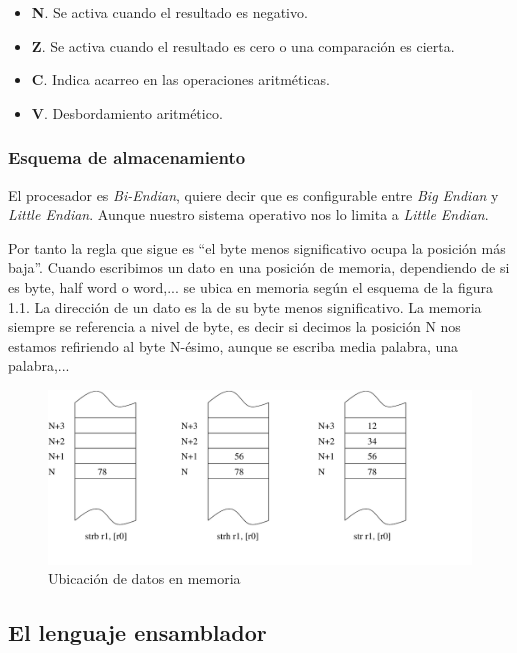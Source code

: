 \begin{descript}
    \begin{itemize}
      \item{\textbf{N}. Se activa cuando el resultado es negativo.}
      \item{\textbf{Z}. Se activa cuando el resultado es cero o una comparación es cierta.}
      \item{\textbf{C}. Indica acarreo en las operaciones aritméticas.}
      \item{\textbf{V}. Desbordamiento aritmético.}
    \end{itemize}
\end{descript}


\subsubsection{Esquema de almacenamiento}

El procesador es {\it Bi-Endian}, quiere decir que es configurable entre {\it Big Endian}
y {\it Little Endian}. Aunque nuestro sistema operativo nos lo limita a {\it Little Endian}.

Por tanto la regla que sigue es ``el byte menos significativo ocupa la posición más baja''.
Cuando escribimos un dato en una posición de memoria, dependiendo de si es byte, half word
o word,... se ubica en memoria según el esquema de la figura 1.1. La dirección de un dato
es la de su byte menos significativo. La memoria siempre se referencia a nivel de byte, es
decir si decimos la posición N nos estamos refiriendo al byte N-ésimo, aunque se escriba
media palabra, una palabra,...

\begin{figure}[h]
  \centering
    \includegraphics[width=13cm]{graphs/memo.pdf}
  \caption{Ubicación de datos en memoria}
  \label{fig:memo}
\end{figure}

\subsection{El lenguaje ensamblador}

